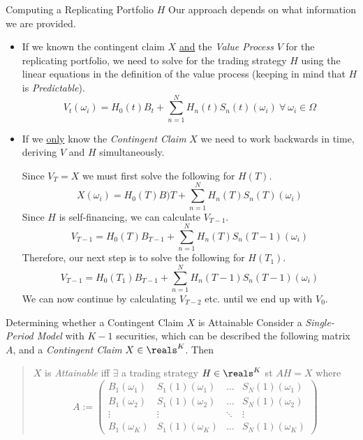 \documentclass[11pt,a4paper]{article}
\begin{document}
  \begin{remark}{Computing a Replicating Portfolio $H$}
    Our approach depends on what information we are provided.
    \begin{itemize}
      \item If we known the contingent claim $X$ \underline{and} the \textit{Value Process} $V$ for the replicating portfolio, we need to solve for the trading strategy $H$ using the linear equations in the definition of the value process (keeping in mind that $H$ is \textit{Predictable}).
      \[ V_t(\omega_i)=H_0(t)B_t+\sum_{n=1}^NH_n(t)S_n(t)(\omega_i)\ \forall\ \omega_i\in\Omega \]

      \item If we \underline{only} know the \textit{Contingent Claim} $X$ we need to work backwards in time, deriving $V$ and $H$ simultaneously.
      \par Since $V_T=X$ we must first solve the following for $H(T)$.
      \[ X(\omega_i)=H_0(T)B)T+\sum_{n=1}^NH_n(T)S_n(T)(\omega_i) \]
      Since $H$ is self-financing, we can calculate $V_{T-1}$.
      \[ V_{T-1}=H_0(T)B_{T-1}+\sum_{n=1}^NH_n(T)S_n(T-1)(\omega_i) \]
      Therefore, our next step is to solve the following for $H(T_1)$.
      \[ V_{T-1}=H_0(T_1)B_{T-1}+\sum_{n=1}^NH_n(T-1)S_n(T-1)(\omega_i) \]
      We can now continue by calculating $V_{T-2}$ etc. until we end up with $V_0$.
    \end{itemize}
  \end{remark}

  \begin{remark}{Determining whether a Contingent Claim $X$ is Attainable}
    Consider a \textit{Single-Period Model} with $K-1$ securities, which can be described the following matrix $A$, and a \textit{Contingent Claim} $X\in\reals^K$. Then
    \begin{quote}
      $X$ is \textit{Attainable} iff $\exists$ a trading strategy $H\in\reals^K$ st $AH=X$ where
      \[ A:=\begin{pmatrix}
          B_1(\omega_1)&S_1(1)(\omega_1)&\dots&S_N(1)(\omega_1)\\
          B_1(\omega_2)&S_1(1)(\omega_2)&\dots&S_N(1)(\omega_2)\\
          \vdots&\vdots&\ddots&\vdots\\
          B_1(\omega_K)&S_1(1)(\omega_K)&\dots&S_N(1)(\omega_K)
      \end{pmatrix} \]
    \end{quote}
  \end{remark}
\end{document}
